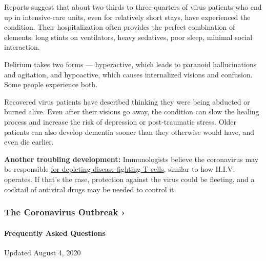 Reports suggest that about two-thirds to three-quarters of virus
patients who end up in intensive-care units, even for relatively short
stays, have experienced the condition. Their hospitalization often
provides the perfect combination of elements: long stints on
ventilators, heavy sedatives, poor sleep, minimal social interaction.

Delirium takes two forms --- hyperactive, which leads to paranoid
hallucinations and agitation, and hypoactive, which causes internalized
visions and confusion. Some people experience both.

Recovered virus patients have described thinking they were being
abducted or burned alive. Even after their visions go away, the
condition can slow the healing process and increase the risk of
depression or post-traumatic stress. Older patients can also develop
dementia sooner than they otherwise would have, and even die earlier.

\textbf{Another troubling development:} Immunologists believe the
coronavirus may be responsible
\href{https://www.nytimes3xbfgragh.onion/2020/06/26/health/coronavirus-immune-system.html}{for
depleting disease-fighting T cells}, similar to how H.I.V. operates. If
that's the case, protection against the virus could be fleeting, and a
cocktail of antiviral drugs may be needed to control it.

\href{https://www.nytimes3xbfgragh.onion/news-event/coronavirus?action=click\&pgtype=Article\&state=default\&region=MAIN_CONTENT_3\&context=storylines_faq}{}

\hypertarget{the-coronavirus-outbreak-}{%
\subsubsection{The Coronavirus Outbreak
›}\label{the-coronavirus-outbreak-}}

\hypertarget{frequently-asked-questions}{%
\paragraph{Frequently Asked
Questions}\label{frequently-asked-questions}}

Updated August 4, 2020

